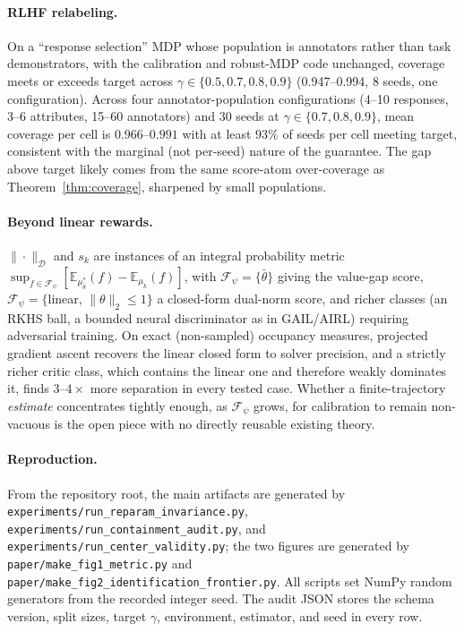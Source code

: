 \documentclass{article}
\newcommand{\Dnorm}[1]{\|#1\|_{\mathcal D}}
\begin{document}
\paragraph{RLHF relabeling.} On a ``response selection'' MDP whose population
is annotators rather than task demonstrators, with the calibration and
robust-MDP code unchanged, coverage meets or exceeds target across
$\gamma\in\{0.5,0.7,0.8,0.9\}$ (0.947--0.994, 8 seeds, one configuration).
Across four annotator-population configurations (4--10 responses, 3--6
attributes, 15--60 annotators) and 30 seeds at $\gamma\in\{0.7,0.8,0.9\}$, mean
coverage per cell is $0.966$--$0.991$ with at least 93\% of seeds per cell
meeting target, consistent with the marginal (not per-seed) nature of the
guarantee. The gap above target likely comes from the same score-atom
over-coverage as Theorem~\ref{thm:coverage}, sharpened by small populations.

\paragraph{Beyond linear rewards.} $\Dnorm{\cdot}$ and $s_k$ are instances of an
integral probability metric $\sup_{f\in\mathcal F_\psi}[\mathbb
E_{\mu^*_{\bar\theta}}(f)-\mathbb E_{\mu_k}(f)]$, with
$\mathcal F_\psi=\{\bar\theta\}$ giving the value-gap score,
$\mathcal F_\psi=\{$linear, $\|\theta\|_2\le1\}$ a closed-form dual-norm score,
and richer classes (an RKHS ball, a bounded neural discriminator as in
GAIL/AIRL) requiring adversarial training. On exact (non-sampled) occupancy
measures, projected gradient ascent recovers the linear closed form to solver
precision, and a strictly richer critic class, which contains the linear one and
therefore weakly dominates it, finds $3$--$4\times$ more separation in every
tested case. Whether a finite-trajectory \emph{estimate} concentrates
tightly enough, as $\mathcal F_\psi$ grows, for calibration to remain
non-vacuous is the open piece with no directly reusable existing theory.

\paragraph{Reproduction.} From the repository root, the main artifacts are
generated by
\texttt{experiments/run\_reparam\_invariance.py},
\texttt{experiments/run\_containment\_audit.py}, and
\texttt{experiments/run\_center\_validity.py}; the two figures are generated by
\texttt{paper/make\_fig1\_metric.py} and
\texttt{paper/make\_fig2\_identification\_frontier.py}. All scripts set NumPy
random generators from the recorded integer seed. The audit JSON stores the
schema version, split sizes, target $\gamma$, environment, estimator, and seed
in every row.
\end{document}
